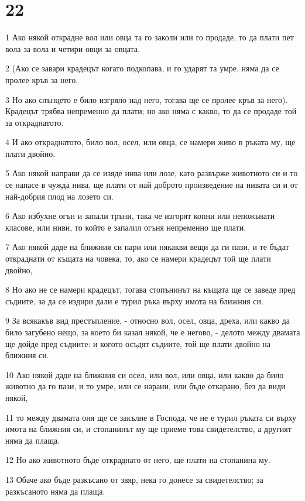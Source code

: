 \chapter{22}

\par 1 Ако някой открадне вол или овца та го заколи или го продаде, то да плати пет вола за вола и четири овци за овцата.
\par 2 (Ако се завари крадецът когато подкопава, и го ударят та умре, няма да се пролее кръв за него.
\par 3 Но ако слънцето е било изгряло над него, тогава ще се пролее кръв за него). Крадецът трябва непременно да плати; но ако няма с какво, то да се продаде той за откраднатото.
\par 4 И ако откраднатото, било вол, осел, или овца, се намери живо в ръката му, ще плати двойно.
\par 5 Ако някой направи да се изяде нива или лозе, като развърже животното си и то се напасе в чужда нива, ще плати от най доброто произведение на нивата си и от най-добрия плод на лозето си.
\par 6 Ако избухне огън и запали тръни, така че изгорят копни или непожънати класове, или ниви, то който е запалил огъня непременно ще плати.
\par 7 Ако някой даде на ближния си пари или някакви вещи да ги пази, и те бъдат откраднати от къщата на човека, то, ако се намери крадецът той ще плати двойно,
\par 8 Но ако не се намери крадецът, тогава стопънинът на къщата ще се заведе пред съдиите, за да се издири дали е турил ръка върху имота на ближния си.
\par 9 За всякакъв вид престъпление, - относно вол, осел, овца, дреха, или какво да било загубено нещо, за което би казал някой, че е негово, - делото между двамата ще дойде пред съдиите: и когото осъдят съдиите, той ще плати двойно на ближния си.
\par 10 Ако някой даде на ближния си осел, или вол, или овца, или какво да било животно да го пази, и то умре, или се нарани, или бъде откарано, без да види някой,
\par 11 то между двамата оня ще се закълне в Господа, че не е турил ръката си върху имота на ближния си, и стопанинът му ще приеме това свидетелство, а другият няма да плаща.
\par 12 Но ако животното бъде откраднато от него, ще плати на стопанина му.
\par 13 Обаче ако бъде разкъсано от звяр, нека го донесе за свидетелство; за разкъсаното няма да плаща.
